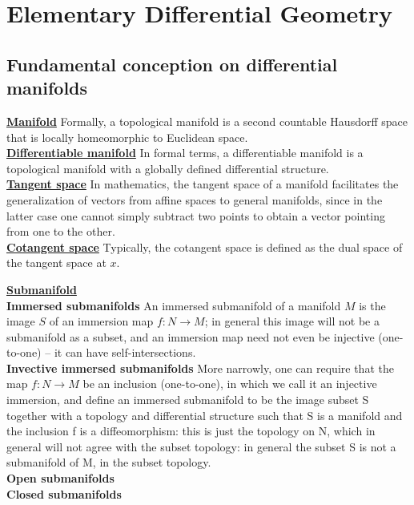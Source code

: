 \chapter{Elementary Differential Geometry}
\section{Fundamental conception on differential manifolds}
\begin{newdef}[Manifold]
\href{https://en.wikipedia.org/wiki/Manifold}{\textbf{Manifold}} 
Formally, a topological manifold is a second countable Hausdorff space that is locally homeomorphic to Euclidean space.\\
\href{https://en.wikipedia.org/wiki/Differentiable_manifold}{\textbf{Differentiable manifold}} 
In formal terms, a differentiable manifold is a topological manifold with a globally defined differential structure. \\
\href{https://en.wikipedia.org/wiki/Tangent_space}{\textbf{Tangent space}} 
In mathematics, the tangent space of a manifold facilitates the generalization of vectors from affine spaces to general manifolds, since in the latter case one cannot simply subtract two points to obtain a vector pointing from one to the other.\\
\href{https://en.wikipedia.org/wiki/Cotangent_space}{\textbf{Cotangent space}} 
Typically, the cotangent space is defined as the dual space of the tangent space at $x$.\\
\end{newdef}

\begin{newdef}[Submanifold]
\href{https://en.wikipedia.org/wiki/Submanifold}{\textbf{Submanifold}}\\
\textbf{Immersed submanifolds} An immersed submanifold of a manifold $M$ is the image $S$ of an immersion map $f:N \to M$; in general this image will not be a submanifold as a subset, and an immersion map need not even be injective (one-to-one) – it can have self-intersections.\\
\textbf{Invective immersed submanifolds} More narrowly, one can require that the map $f:N \to M$ be an inclusion (one-to-one), in which we call it an injective immersion, and define an immersed submanifold to be the image subset S together with a topology and differential structure such that S is a manifold and the inclusion f is a diffeomorphism: this is just the topology on N, which in general will not agree with the subset topology: in general the subset S is not a submanifold of M, in the subset topology.\\
\textbf{Open submanifolds}\\
\textbf{Closed submanifolds}\\
\end{newdef}

